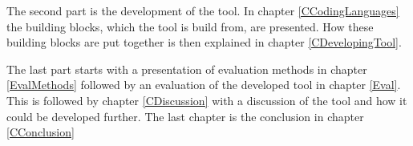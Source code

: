 The second part is the development of the tool. In chapter \ref{CCodingLanguages} the building blocks, which the tool is build from, are presented. How these building blocks are put together is then explained in chapter \ref{CDevelopingTool}. 

The last part starts with a presentation of evaluation methods in chapter \ref{EvalMethods} followed by an evaluation of the developed tool in chapter \ref{Eval}. This is followed by chapter \ref{CDiscussion} with a discussion of the tool and how it could be developed further. The last chapter is the conclusion in chapter \ref{CConclusion} 

